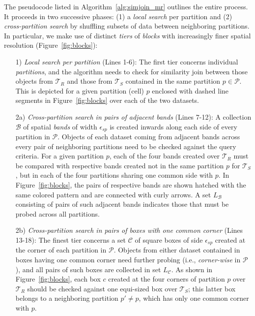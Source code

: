 The pseudocode listed in Algorithm~\ref{alg:simjoin_mr} outlines the entire process. It proceeds in two successive phases: (1) a {\em local search} per partition and (2) {\em cross-partition search} by shuffling subsets of data between neighboring partitions. In particular, we make use of distinct {\em tiers} of {\em blocks} with increasingly finer spatial resolution (Figure~\ref{fig:blocks}): 

\begin{enumerate}
\item[1)] {\em Local search per partition} (Lines 1-6): The first tier concerns individual {\em partitions}, and the algorithm needs to check for similarity join between those objects from $\mathcal{T}_{R}$ and those from $\mathcal{T}_{S}$ contained in the same partition $p \in \mathcal{P}$. This is depicted for a given partition (cell) $p$ enclosed with dashed line segments in Figure~\ref{fig:blocks} over each of the two datasets. 
\item[2a)] {\em Cross-partition search in pairs of adjacent bands} (Lines 7-12): A collection $\mathcal{B}$ of spatial {\em bands} of width $\epsilon_{sp}$ is created inwards along each side of every partition in $\mathcal{P}$. Objects of each dataset coming from adjacent bands across every pair of neighboring partitions need to be checked against the query criteria. For a given partition $p$, each of the four bands created over $\mathcal{T}_{R}$ must be compared with respective bands created not in the same partition $p$ for $\mathcal{T}_{S}$, but in each of the four partitions sharing one common side with $p$. In Figure~\ref{fig:blocks}, the pairs of respective bands are shown hatched with the same colored pattern and are connected with curly arrows. A set $L_{\mathcal{B}}$ consisting of pairs of such adjacent bands indicates those that must be probed across all partitions.
\item[2b)] {\em Cross-partition search in pairs of boxes with one common corner} (Lines 13-18): The finest tier concerns a set $\mathcal{C}$ of square boxes of side $\epsilon_{sp}$ created at the corner of each partition in $\mathcal{P}$. Objects from either dataset contained in boxes having one common corner need further probing (i.e., {\em corner-wise} in $\mathcal{P}$), and all pairs of such boxes are collected in set $L_{\mathcal{C}}$. As shown in Figure~\ref{fig:blocks}, each box $c$ created at the four corners of partition $p$ over $\mathcal{T}_{R}$ should be checked against one equi-sized box over $\mathcal{T}_{S}$; this latter box belongs to a neighboring partition $p' \neq p$, which has only one common corner with $p$. 
\end{enumerate}

